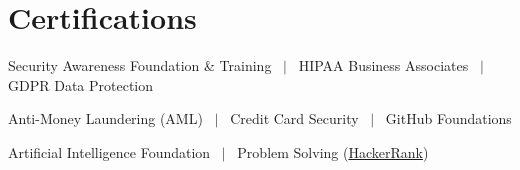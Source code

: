 \documentclass[letterpaper,10pt]{article}
\newenvironment{resume_list}{
  \vspace{-6pt}
  \begin{itemize}[itemsep=-1px, parsep=0.5pt, topsep=1pt, leftmargin=22pt]
}{
  \end{itemize}
  \vspace{-2pt}
}
\begin{document}
\section{Certifications}
\begin{resume_list}
  \item Security Awareness Foundation \& Training ~$|$~ HIPAA Business Associates ~$|$~ GDPR Data Protection
  \item Anti-Money Laundering (AML) ~$|$~ Credit Card Security ~$|$~ GitHub Foundations
  \item Artificial Intelligence Foundation ~$|$~ Problem Solving (\href{https://www.hackerrank.com/profile/sooraj_bcss19}{HackerRank})
\end{resume_list}
\end{document}
